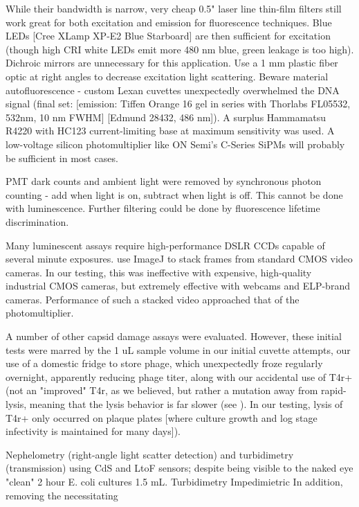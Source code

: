 \documentclass[paper.tex]{subfiles}
\begin{document}
\begin{multicols}{1}
While their bandwidth is narrow, very cheap 0.5" laser line thin-film filters still work great for both excitation and emission for fluorescence techniques. Blue LEDs [Cree XLamp XP-E2 Blue Starboard] are then sufficient for excitation (though high CRI white LEDs emit more 480 nm blue, green leakage is too high). Dichroic mirrors are unnecessary for this application. Use a 1 mm plastic fiber optic at right angles to decrease excitation light scattering. Beware material autofluorescence - custom Lexan cuvettes unexpectedly overwhelmed the DNA signal (final set: [emission: Tiffen Orange 16 gel\cite{lide2004crc} in series with Thorlabs FL05532, 532nm, 10 nm FWHM] [Edmund 28432, 486 nm]). A surplus Hammamatsu R4220 with HC123 current-limiting base at maximum sensitivity was used. A low-voltage silicon photomultiplier like ON Semi's C-Series SiPMs will probably be sufficient in most cases.

PMT dark counts and ambient light were removed by synchronous photon counting - add when light is on, subtract when light is off.  This cannot be done with luminescence. Further filtering could be done by fluorescence lifetime discrimination. 

Many luminescent assays require high-performance DSLR CCDs capable of several minute exposures. \cite{Image2012} use ImageJ\cite{NIH2012} to stack frames from standard CMOS video cameras. In our testing, this was ineffective with expensive, high-quality industrial CMOS cameras, but extremely effective with webcams and ELP-brand cameras. Performance of such a stacked video approached that of the photomultiplier. 

A number of other capsid damage assays were evaluated. However, these initial tests were marred by the 1 uL sample volume in our initial cuvette attempts, our use of a domestic fridge to store phage, which unexpectedly froze regularly overnight, apparently reducing phage titer, along with our accidental use of T4r+ (not an "improved" T4r, as we believed, but rather a mutation away from rapid-lysis, meaning that the lysis behavior is far slower (see \cite{Spontaneous1946}). In our testing, lysis of T4r+ only occurred on plaque plates [where culture growth and log stage infectivity is maintained for many days]). 

Nephelometry (right-angle light scatter detection) and turbidimetry (transmission) using CdS and LtoF sensors; despite being visible to the naked eye "clean" 2 hour E. coli cultures 1.5 mL. Turbidimetry\cite{Fast2019} Impedimietric In addition, removing the necessitating 


\end{multicols}
\end{document}
